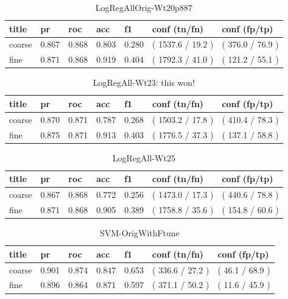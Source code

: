 \documentclass[ms]{nuthesis}
\begin{document}
\FloatBarrier
\begin{table}[H]
\centering
\begin{tabular}{|l||l||l||l||l||l||l|}\toprule
title & pr & roc & acc & f1 & conf (tn/fn) & conf (fp/tp) \\ \midrule
coarse & 0.867 & 0.868 & 0.803 & 0.280 & ( 1537.6 / 19.2 ) & ( 376.0 / 76.9 ) \\
fine & 0.871 & 0.868 & 0.919 & 0.404 & ( 1792.3 / 41.0 ) & ( 121.2 / 55.1 ) \\ \bottomrule
\end{tabular}
\caption{LogRegAllOrig-Wt20p887}
\label{tab:LogRegAllOrig-Wt20p887}
\end{table}
\FloatBarrier

\FloatBarrier
\begin{table}[H]
\centering
\begin{tabular}{|l||l||l||l||l||l||l|}\toprule
title & pr & roc & acc & f1 & conf (tn/fn) & conf (fp/tp) \\ \midrule
coarse & 0.870 & 0.871 & 0.787 & 0.268 & ( 1503.2 / 17.8 ) & ( 410.4 / 78.3 ) \\
fine & 0.875 & 0.871 & 0.913 & 0.403 & ( 1776.5 / 37.3 ) & ( 137.1 / 58.8 ) \\ \bottomrule
\end{tabular}
\caption{LogRegAll-Wt23: this won!}
\label{tab:LogRegAll-Wt23}
\end{table}
\FloatBarrier

\FloatBarrier
\begin{table}[H]
\centering
\begin{tabular}{|l||l||l||l||l||l||l|}\toprule
title & pr & roc & acc & f1 & conf (tn/fn) & conf (fp/tp) \\ \midrule
coarse & 0.867 & 0.868 & 0.772 & 0.256 & ( 1473.0 / 17.3 ) & ( 440.6 / 78.8 ) \\
fine & 0.871 & 0.868 & 0.905 & 0.389 & ( 1758.8 / 35.6 ) & ( 154.8 / 60.6 ) \\ \bottomrule
\end{tabular}
\caption{LogRegAll-Wt25}
\label{tab:LogRegAll-Wt25}
\end{table}
\FloatBarrier


\FloatBarrier
\begin{table}[H]
\centering
\begin{tabular}{|l||l||l||l||l||l||l|}\toprule
title & pr & roc & acc & f1 & conf (tn/fn) & conf (fp/tp) \\ \midrule
coarse & 0.901 & 0.874 & 0.847 & 0.653 & ( 336.6 / 27.2 ) & ( 46.1 / 68.9 ) \\
fine & 0.896 & 0.864 & 0.871 & 0.597 & ( 371.1 / 50.2 ) & ( 11.6 / 45.9 ) \\ \bottomrule
\end{tabular}
\caption{SVM-OrigWithFtune}
\label{tab:SVM-OrigWithFtune}
\end{table}
\FloatBarrier
\end{document}

